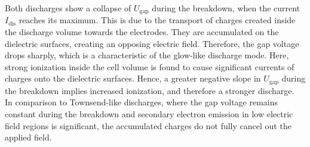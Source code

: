 \documentclass[a4paper,10pt,twoside]{article}
\newcommand{\ix}[1]{_\text{#1}}
\begin{document}
			Both discharges show a collapse of $U\ix{gap}$ during the breakdown, when the current $I\ix{dis}$ reaches its maximum. This is due to the transport of charges created inside the discharge volume towards the electrodes. They are accumulated on the dielectric surfaces, creating an opposing electric field. Therefore, the gap voltage drops sharply, which is a characteristic of the glow-like discharge mode. Here, strong ionization inside the cell volume is found to cause significant currents of charges onto the dielectric surfaces. Hence, a greater negative slope in $U\ix{gap}$ during the breakdown implies increased ionization, and therefore a stronger discharge. \\
			In comparison to Townsend-like discharges, where the gap voltage remains constant during the breakdown and secondary electron emission in low electric field regions is significant, the accumulated charges do not fully cancel out the applied field. 
			
		\onecolumn
				
\end{document}
